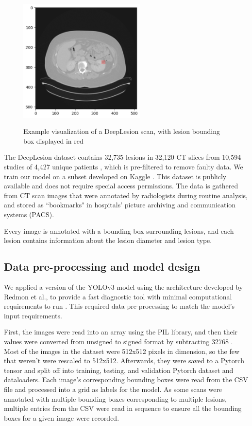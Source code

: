 \begin{figure}
 \begin{center}
 \includegraphics[width=2.5in]{images/example_scan.png}\\
 \caption{Example visualization of a DeepLesion scan, with lesion bounding box displayed in red}\label{example_scan}
 \end{center}
\end{figure}


The DeepLesion dataset contains 32,735 lesions in 32,120 CT slices from 10,594 studies of 4,427 unique patients \cite{deeplesion}, which is pre-filtered to remove faulty data. We train our model on a subset developed on Kaggle \cite{kaggle}. This dataset is publicly available and does not require special access permissions. The data is gathered from CT scan images that were annotated by radiologists during routine analysis, and stored as ``bookmarks" in hospitals' picture archiving and communication systems (PACS).  

Every image is annotated with a bounding box surrounding lesions, and each lesion contains information about the lesion diameter and lesion type. 

\subsection{Data pre-processing and model design}
We applied a version of the YOLOv3 model using the architecture developed by Redmon et al., to provide a fast diagnostic tool with minimal computational requirements to run \cite{yolov3}. This required data pre-processing to match the model's input requirements.

First, the images were read into an array using the PIL library, and then their values were converted from unsigned to signed format by subtracting 32768 \cite{deeplesion}. Most of the images in the dataset were 512x512 pixels in dimension, so the few that weren't were rescaled to 512x512. Afterwards, they were saved to a Pytorch tensor and split off into training, testing, and validation Pytorch dataset and dataloaders. Each image's corresponding bounding boxes were read from the CSV file and processed into a grid as labels for the model. As some scans were annotated with multiple bounding boxes corresponding to multiple lesions, multiple entries from the CSV were read in sequence to ensure all the bounding boxes for a given image were recorded.

